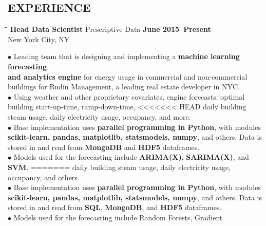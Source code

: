 \documentclass{resume}
\begin{document}
 
\address{\hspace{0.7in} 
\href{mailto:david.karapetyan@gmail.com}{\nolinkurl{david.karapetyan@gmail.com}}
\\
\ \hspace{0.7in}   \url{http://davidkarapetyan.com}}
\begin{resume}
\section{EXPERIENCE}
	\vspace{-0.05mm}

\begin{tabbing}
\hspace{2.3in}\= \hspace{2.6in}\= \kill
{\bf Head Data Scientist} \> Prescriptive Data   
\>\textbf{June 2015--Present } \\
    \>New York City, NY 
\end{tabbing}
$\bullet$
Leading team that is designing and implementing a \textbf{machine learning
forecasting \\ and analytics engine} for energy usage in commercial and non-commercial
buildings for Rudin Management, a leading real estate developer in NYC.  \\
$\bullet$ Using weather and other proprietary covariates, engine forecasts: optimal building start-up-time, ramp-down-time, 
<<<<<<< HEAD
daily building steam usage, daily electricity usage, occupancy, and more. \\
$\bullet$ 
Base implementation uses \textbf{parallel programming in Python}, 
with modules \textbf{scikit-learn, pandas, matplotlib, statsmodels, numpy}, and others. 
Data is stored in and read from \textbf{MongoDB} and \textbf{HDF5} dataframes.\\
$\bullet$
Models used for the forecasting include \textbf{ARIMA(X)}, \textbf{SARIMA(X)}, and \textbf{SVM}. 
=======
daily building steam usage, daily electricity usage, occupancy, and others. \\
$\bullet$ 
Base implementation uses \textbf{parallel programming in Python}, 
with modules \textbf{scikit-learn, pandas, matplotlib, statsmodels, numpy}, and others. 
Data is stored in and read from \textbf{SQL}, \textbf{MongoDB}, and \textbf{HDF5} dataframes.\\
$\bullet$
Models used for the forecasting include Random Forests, Gradient

\end{resume}
\end{document}
